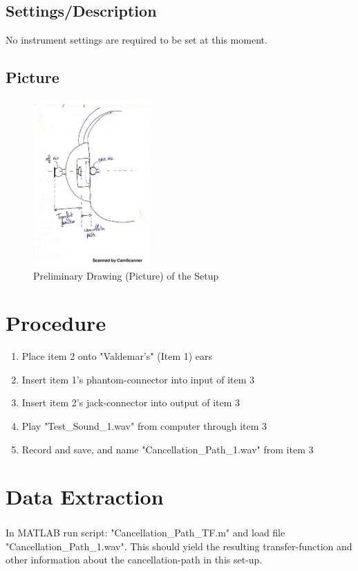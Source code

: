 \documentclass[12pt,a4paper,openright]{article}
\begin{document}
\subsection{Settings/Description}
No instrument settings are required to be set at this moment.

\subsection{Picture}
\begin{figure}[H]
	\centering
	\includegraphics[width=0.4\textwidth]{picture.png}
	\caption{Preliminary Drawing (Picture) of the Setup}
	\label{PictureDrawing}
\end{figure}

\section{Procedure}
\begin{enumerate}
	\item Place item 2 onto "Valdemar's" (Item 1) ears
	\item Insert item 1's phantom-connector into input of item 3
	\item Insert item 2's jack-connector into output of item 3
	\item Play "Test\_Sound\_1.wav" from computer through item 3
	\item Record and save, and name "Cancellation\_Path\_1.wav" from item 3
\end{enumerate}

\section{Data Extraction}
In MATLAB\textsuperscript{\textregistered} run script: "Cancellation\_Path\_TF.m" and load file "Cancellation\_Path\_1.wav". This should yield the resulting transfer-function and other information about the cancellation-path in this set-up.
\end{document}
